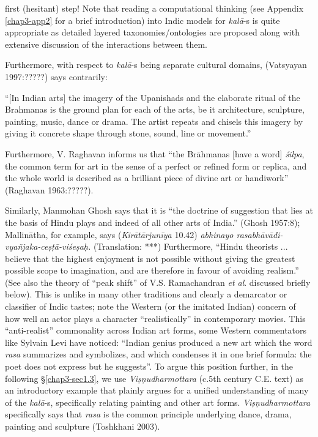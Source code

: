 first (hesitant) step! Note that reading a computational thinking (see Appendix \ref{chap3-app2} for a brief introduction) into Indic models for \textsl{kalā}-s is quite appropriate as detailed layered taxonomies/ontologies are proposed along with extensive discussion of the interactions between them.

Furthermore, with respect to \textsl{kalā}-s being separate cultural domains, (Vatsyayan
 1997:?????) says contrarily:

\begin{myquote}
“[In Indian arts] the imagery of the Upanishads and the elaborate ritual of the Brahmanas is the ground plan for each of the arts, be it architecture, sculpture, painting, music, dance or drama. The artist repeats and chisels this imagery by giving it concrete shape through stone, sound, line or movement.”
\end{myquote}

Furthermore, V. Raghavan informs us that “the Brāhmanas [have a word] \textsl{śilpa}, the common term for art in the sense of a perfect or refined form or replica, and the whole world is described as a brilliant piece of divine art or handiwork” (Raghavan 1963:?????).

Similarly, Manmohan Ghosh says that it is “the doctrine of suggestion that lies at the basis of Hindu plays and indeed of all other arts of India.” (Ghosh 1957:8); Mallinātha, for example, says (\textsl{Kirātārjunīya} 10.42) \textsl{abhinayo rasabhāvādi-vyañjaka-ceṣṭā-viśeṣaḥ.} (Translation: ***) Furthermore, “Hindu theorists ... believe that the highest enjoyment is not possible without giving the greatest possible scope to imagination, and are therefore in favour of avoiding realism.” (See also the theory of “peak shift” of V.S. Ramachandran \textsl{et al}. discussed briefly below). This is unlike in many other traditions and clearly a demarcator or classifier of Indic tastes; note the Western (or the imitated Indian) concern of how well an actor plays a character “realistically” in contemporary movies. This “anti-realist” commonality across Indian art forms, some Western commentators like Sylvain Levi have noticed: “Indian genius produced a new art which the word \textsl{rasa} summarizes and symbolizes, and which condenses it in one brief formula: the poet does not express but he suggests”. To argue this position further, in the following \S\ref{chap3-sec1.3}, we use \textsl{Viṣṇudharmottara} (c.5th century C.E. text) as an introductory example that plainly argues for a unified understanding of many of the \textsl{kalā}-s, specifically relating painting and other art forms. \textsl{Viṣṇudharmottara} specifically says that \textsl{rasa} is the common principle underlying dance, drama, painting and sculpture (Toshkhani 2003).

